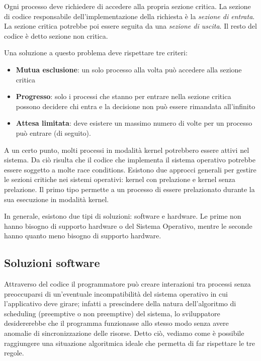 \documentclass[a4paper]{article}
\begin{document}
Ogni processo deve richiedere di accedere alla propria sezione critica. La sezione di codice responsabile dell'implementazione della richiesta è la \textit{sezione di entrata}. La sezione critica potrebbe poi essere seguita da una \textit{sezione di uscita}. Il resto del codice è detto sezione non critica.

Una soluzione a questo problema deve rispettare tre criteri:
\begin{itemize}
    \item \textbf{Mutua esclusione}: un solo processo alla volta può accedere alla sezione critica
    \item \textbf{Progresso}: solo i processi che stanno per entrare nella sezione critica possono decidere chi entra e la decisione non può essere rimandata all'infinito
    \item \textbf{Attesa limitata}: deve esistere un massimo numero di volte per un processo può entrare (di seguito).
\end{itemize}

A un certo punto, molti processi in modalità kernel potrebbero essere attivi nel sistema. Da ciò risulta che il codice che implementa il sistema operativo potrebbe essere soggetto a molte race conditions. Esistono due approcci generali per gestire le sezioni critiche nei sistemi operativi: kernel con prelazione e kernel senza prelazione. Il primo tipo permette a un processo di essere prelazionato durante la sua esecuzione in modalità kernel.

In generale, esistono due tipi di soluzioni: software e hardware. Le prime non hanno bisogno di supporto hardware o del Sistema Operativo, mentre le seconde hanno quanto meno bisogno di supporto hardware.

\subsection{Soluzioni software}
Attraverso del codice il programmatore può creare interazioni tra processi senza preoccuparsi di un’eventuale incompatibilità del sistema operativo in cui l’applicativo deve girare; infatti a prescindere della natura dell’algoritmo di scheduling (preemptive o non preemptive) del sistema, lo sviluppatore desidererebbe che il programma funzionasse allo stesso modo senza avere anomalie di sincronizzazione delle risorse. Detto ciò, vediamo come è possibile raggiungere una situazione algoritmica ideale che permetta di far rispettare le tre regole.
\end{document}
